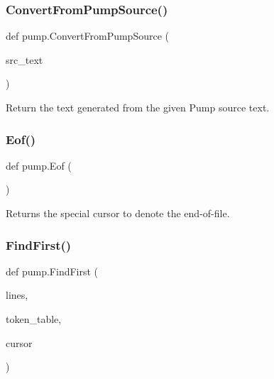 \mbox{\label{namespacepump_a568fe53d1443489ac15bac4a0f9faf91}} 
\subsubsection{\texorpdfstring{Convert\+From\+Pump\+Source()}{ConvertFromPumpSource()}}
{\footnotesize\ttfamily def pump.\+Convert\+From\+Pump\+Source (\begin{DoxyParamCaption}\item[{}]{src\+\_\+text }\end{DoxyParamCaption})}

\begin{DoxyVerb}Return the text generated from the given Pump source text.\end{DoxyVerb}
 \mbox{\label{namespacepump_a38844b22bd5a51c098b07c2c36c5c5b3}} 
\subsubsection{\texorpdfstring{Eof()}{Eof()}}
{\footnotesize\ttfamily def pump.\+Eof (\begin{DoxyParamCaption}{ }\end{DoxyParamCaption})}

\begin{DoxyVerb}Returns the special cursor to denote the end-of-file.\end{DoxyVerb}
 \mbox{\label{namespacepump_a08f2d05c192d11a134c008287bafef07}} 
\subsubsection{\texorpdfstring{Find\+First()}{FindFirst()}}
{\footnotesize\ttfamily def pump.\+Find\+First (\begin{DoxyParamCaption}\item[{}]{lines,  }\item[{}]{token\+\_\+table,  }\item[{}]{cursor }\end{DoxyParamCaption})}

